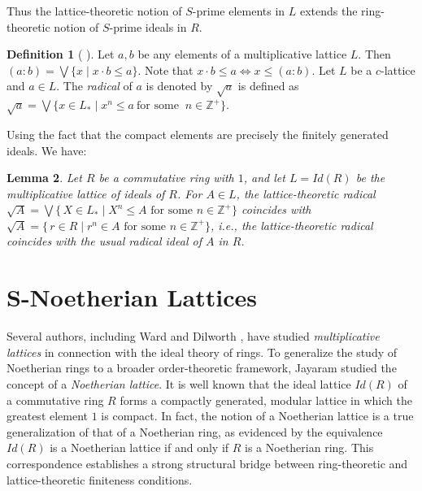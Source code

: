 \documentclass[10pt,twoside,a4]{amsart}
\numberwithin{equation}{section}
\theoremstyle{plain}
\newtheorem{lem}{Lemma}[section]
\theoremstyle{definition}
\newtheorem{defn}[lem]{Definition}
\begin{document}
	
	Thus the lattice-theoretic notion of $S$-prime elements in $L$  extends the ring-theoretic notion of $S$-prime ideals in $R$.
		
		
		\begin{defn} [ \cite{D, SJ, WD}]
			Let $a,b $ be any elements of    a multiplicative lattice $L$. Then $(a:b) =
			\bigvee \{x \;|\;  x\cdot b \leq a\}$. Note that $x \cdot b \leq a
			\Leftrightarrow x \leq (a:b)$.  Let $L$ be a $c$-lattice and $a\in L$. The \textit{radical} of $a$ is denoted by $\sqrt a$ is defined as $\sqrt a =
			\bigvee \{x\in L_* \;|\;  x^n \leq a ~ \textrm{for some }~ n\in \mathbb{Z}^+\}$. \end{defn}
		Using the fact that the compact elements are precisely the finitely generated ideals.  We have:
		
		\begin{lem}\label{lem:radical-equals-ring}
			Let $R$ be a commutative ring with $1$, and let $L=Id(R)$ be the multiplicative lattice of ideals of $R$. For $A\in L$,  the lattice-theoretic radical
			$	\sqrt{A}	=\bigvee\{\,X\in L_* \mid X^n \leq A \text{ for some } n\in\mathbb{Z}^+ \}$ coincides with $\sqrt{A} = \{\, r\in R \mid r^n \in A \text{ for some } n\in\mathbb{Z}^+ \}$,  i.e., the lattice-theoretic radical coincides with the usual radical ideal of $A$ in $R$.
		\end{lem}
		
		
		



\section{S-Noetherian Lattices}


Several authors, including Ward and Dilworth \cite{WD}, have studied \textit{multiplicative lattices} in connection with the ideal theory of rings. To generalize the study  of Noetherian rings to a broader order-theoretic framework, Jayaram\cite{JG} studied the concept of a \textit{Noetherian  lattice}. It is well known that the ideal lattice $Id(R)$ of a commutative ring $R$ forms a compactly generated, modular lattice in which the greatest element $1$ is compact. In fact, the notion of a Noetherian lattice is a true generalization of that of a Noetherian ring, as evidenced by the equivalence
$Id(R) $ is a Noetherian lattice  if and only if $R$  is a Noetherian ring.
This correspondence establishes a strong structural bridge between ring-theoretic and lattice-theoretic finiteness conditions.
\end{document}
